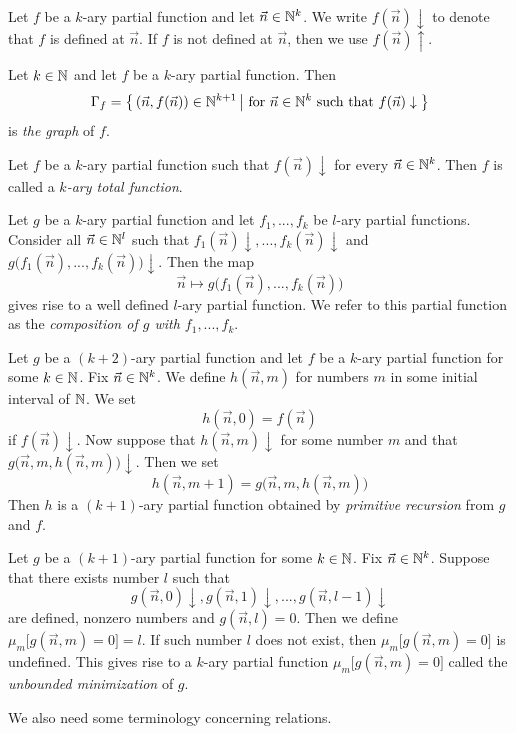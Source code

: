 \documentclass[10pt]{amsart}
\begin{document}
\begin{remark}\label{remark:up_and_down_arrows_for_arguments_of_definition}
	Let $f$ be a $k$-ary partial function and let $\vec{n} \in {\mathbb N}^k$. We write $f(\vec{n})\downarrow$ to denote that $f$ is defined at $\vec{n}$. If $f$ is not defined at $\vec{n}$, then we use $f(\vec{n})\uparrow$.
\end{remark}

\begin{definition}
	Let $k \in {\mathbb N}$ and let $f$ be a $k$-ary partial function. Then
	$$\Gamma_f = \big\{\left(\vec{n},f(\vec{n})\right)\in {\mathbb N}^{k+1}\,\big|\mbox{ for }\vec{n} \in {\mathbb N}^k\mbox{ such that }f(\vec{n})\downarrow\big\}$$
	is \textit{the graph} of $f$.
\end{definition}

\begin{definition}
	Let $f$ be a $k$-ary partial function such that $f(\vec{n})\downarrow$ for every $\vec{n} \in {\mathbb N}^k$. Then $f$ is called a \textit{$k$-ary total function}.
\end{definition}

\begin{definition}
	Let $g$ be a $k$-ary partial function and let $f_1,...,f_k$ be $l$-ary partial functions. Consider all $\vec{n} \in {\mathbb N}^l$ such that $f_1(\vec{n})\downarrow,...,f_k(\vec{n})\downarrow$ and $g\big(f_1(\vec{n}),...,f_k(\vec{n})\big)\downarrow$. Then the map
	$$\vec{n} \mapsto g\big(f_1(\vec{n}),...,f_k(\vec{n})\big)$$
	gives rise to a well defined $l$-ary partial function. We refer to this partial function as the \textit{composition of $g$ with $f_1,...,f_k$}.
\end{definition}

\begin{definition}
	Let $g$ be a $(k + 2)$-ary partial function and let $f$ be a $k$-ary partial function for some $k \in {\mathbb N}$. Fix $\vec{n} \in {\mathbb N}^k$. We define $h(\vec{n},m)$ for numbers $m$ in some initial interval of ${\mathbb N}$. We set
	$$h(\vec{n},0) = f(\vec{n})$$
	if $f(\vec{n})\downarrow$. Now suppose that $h(\vec{n},m)\downarrow$ for some number $m$ and that $g\big(\vec{n}, m, h\left(\vec{n},m\right)\big)\downarrow$. Then we set
	$$h(\vec{n}, m + 1) = g\big(\vec{n}, m, h\left(\vec{n},m\right)\big)$$
	Then $h$ is a $(k+1)$-ary partial function obtained by \textit{primitive recursion} from $g$ and $f$.
\end{definition}

\begin{definition}
	Let $g$ be a $(k + 1)$-ary partial function for some $k \in {\mathbb N}$. Fix $\vec{n} \in {\mathbb N}^k$. Suppose that there exists number $l$ such that
	$$g\left(\vec{n},0\right)\downarrow,g\left(\vec{n},1\right)\downarrow,...,g\left(\vec{n},l - 1\right)\downarrow$$
	are defined, nonzero numbers and $g(\vec{n},l) = 0$. Then we define $\mu_m \big[g\left(\vec{n},m\right) = 0\big] = l$. If such number $l$ does not exist, then $\mu_m \big[g\left(\vec{n},m\right) = 0\big]$ is undefined. This gives rise to a $k$-ary partial function $\mu_m \big[g(\vec{n}, m) = 0\big]$ called the \textit{unbounded minimization} of $g$.
\end{definition}
\noindent
We also need some terminology concerning relations.
\end{document}
